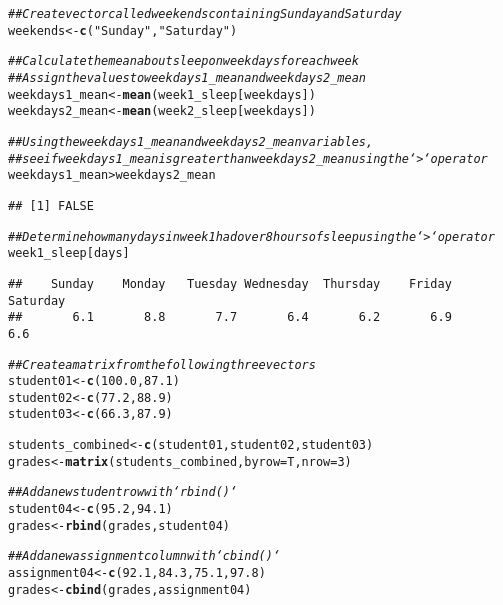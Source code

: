 \documentclass{article}\usepackage[]{graphicx}\usepackage[]{xcolor}
\makeatletter
\newcommand{\hlnum}[1]{\textcolor[rgb]{0.686,0.059,0.569}{#1}}%
\newcommand{\hlstr}[1]{\textcolor[rgb]{0.192,0.494,0.8}{#1}}%
\newcommand{\hlcom}[1]{\textcolor[rgb]{0.678,0.584,0.686}{\textit{#1}}}%
\newcommand{\hlopt}[1]{\textcolor[rgb]{0,0,0}{#1}}%
\newcommand{\hlstd}[1]{\textcolor[rgb]{0.345,0.345,0.345}{#1}}%
\newcommand{\hlkwb}[1]{\textcolor[rgb]{0.69,0.353,0.396}{#1}}%
\newcommand{\hlkwc}[1]{\textcolor[rgb]{0.333,0.667,0.333}{#1}}%
\newcommand{\hlkwd}[1]{\textcolor[rgb]{0.737,0.353,0.396}{\textbf{#1}}}%
\newenvironment{kframe}{%
 \def\at@end@of@kframe{}%
 \ifinner\ifhmode%
  \def\at@end@of@kframe{\end{minipage}}%
  \begin{minipage}{\columnwidth}%
 \fi\fi%
 \def\FrameCommand##1{\hskip\@totalleftmargin \hskip-\fboxsep
 \colorbox{shadecolor}{##1}\hskip-\fboxsep
     \hskip-\linewidth \hskip-\@totalleftmargin \hskip\columnwidth}%
 \MakeFramed {\advance\hsize-\width
   \@totalleftmargin\z@ \linewidth\hsize
   \@setminipage}}%
 {\par\unskip\endMakeFramed%
 \at@end@of@kframe}
\newenvironment{knitrout}{}{} %
\makeatother
\begin{document}
\begin{knitrout}
\begin{kframe}
\begin{alltt}
\hlcom{## Create vector called weekends containing Sunday and Saturday}
\hlstd{weekends} \hlkwb{<-} \hlkwd{c}\hlstd{(}\hlstr{"Sunday"}\hlstd{,} \hlstr{"Saturday"}\hlstd{)}

\hlcom{## Calculate the mean about sleep on weekdays for each week}
\hlcom{## Assign the values to weekdays1_mean and weekdays2_mean}
\hlstd{weekdays1_mean} \hlkwb{<-} \hlkwd{mean}\hlstd{(week1_sleep[weekdays])}
\hlstd{weekdays2_mean} \hlkwb{<-} \hlkwd{mean}\hlstd{(week2_sleep[weekdays])}

\hlcom{## Using the weekdays1_mean and weekdays2_mean variables,}
\hlcom{## see if weekdays1_mean is greater than weekdays2_mean using the `>` operator}
\hlstd{weekdays1_mean} \hlopt{>} \hlstd{weekdays2_mean}
\end{alltt}
\begin{verbatim}
## [1] FALSE
\end{verbatim}
\begin{alltt}
\hlcom{## Determine how many days in week 1 had over 8 hours of sleep using the `>` operator}
\hlstd{week1_sleep[days]}
\end{alltt}
\begin{verbatim}
##    Sunday    Monday   Tuesday Wednesday  Thursday    Friday  Saturday 
##       6.1       8.8       7.7       6.4       6.2       6.9       6.6
\end{verbatim}
\begin{alltt}
\hlcom{## Create a matrix from the following three vectors}
\hlstd{student01} \hlkwb{<-} \hlkwd{c}\hlstd{(}\hlnum{100.0}\hlstd{,} \hlnum{87.1}\hlstd{)}
\hlstd{student02} \hlkwb{<-} \hlkwd{c}\hlstd{(}\hlnum{77.2}\hlstd{,} \hlnum{88.9}\hlstd{)}
\hlstd{student03} \hlkwb{<-} \hlkwd{c}\hlstd{(}\hlnum{66.3}\hlstd{,} \hlnum{87.9}\hlstd{)}

\hlstd{students_combined} \hlkwb{<-} \hlkwd{c}\hlstd{(student01, student02, student03)}
\hlstd{grades} \hlkwb{<-} \hlkwd{matrix}\hlstd{(students_combined,} \hlkwc{byrow} \hlstd{= T,} \hlkwc{nrow} \hlstd{=} \hlnum{3}\hlstd{)}

\hlcom{## Add a new student row with `rbind()`}
\hlstd{student04} \hlkwb{<-} \hlkwd{c}\hlstd{(}\hlnum{95.2}\hlstd{,} \hlnum{94.1}\hlstd{)}
\hlstd{grades} \hlkwb{<-} \hlkwd{rbind}\hlstd{(grades, student04)}

\hlcom{## Add a new assignment column with `cbind()`}
\hlstd{assignment04} \hlkwb{<-} \hlkwd{c}\hlstd{(}\hlnum{92.1}\hlstd{,} \hlnum{84.3}\hlstd{,} \hlnum{75.1}\hlstd{,} \hlnum{97.8}\hlstd{)}
\hlstd{grades} \hlkwb{<-} \hlkwd{cbind}\hlstd{(grades, assignment04)}


\end{alltt}
\end{kframe}
\end{knitrout}
\end{document}
